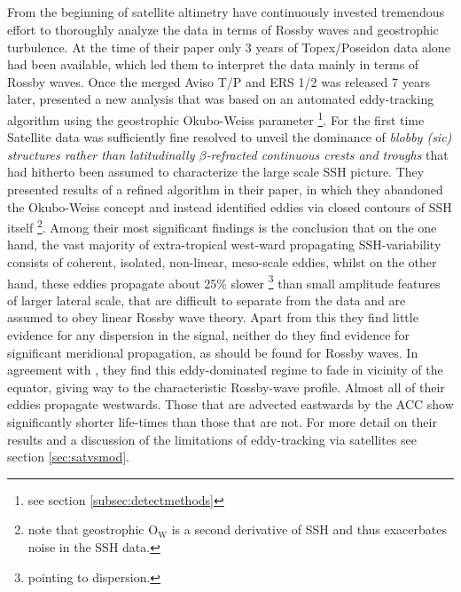 \subsection{\cite{Killworth1997a,Chelton2007,Chelton2011}}\label{sec:hist_chelton}
From the beginning of satellite altimetry \citeauthor{Chelton2011} have continuously invested tremendous effort to thoroughly analyze the data in terms of
Rossby waves and geostrophic turbulence. At the time of their \citeyear{Killworth1997a} paper only 3 years of Topex/Poseidon data alone had been available,
which led them to interpret the data mainly in terms of Rossby waves. Once the merged Aviso T/P and ERS 1/2  was released 7 years later,
\citeauthor{Chelton2007} presented a new analysis that was based on an automated eddy-tracking algorithm using the geostrophic Okubo-Weiss parameter
\footnote{see section \ref{subsec:detectmethods}}. For the first time Satellite data was sufficiently fine resolved to unveil the dominance of \textit{blobby
(sic) structures rather than latitudinally $\beta$-refracted continuous crests and troughs} that had hitherto been assumed to characterize the large scale SSH
picture. They presented results of a refined algorithm in their \citeyear{Chelton2011} paper, in
which they abandoned the Okubo-Weiss concept and instead identified eddies via closed contours of SSH itself \footnote{note that geostrophic $\mathrm{O_W}$ is a
second derivative of SSH and thus exacerbates noise in the SSH data.}. Among their most significant findings is the conclusion that on the one hand, the vast
majority of extra-tropical west-ward propagating SSH-variability consists of coherent, isolated, non-linear, meso-scale eddies, whilst on the other hand, these
eddies propagate about 25\% slower \footnote{pointing to dispersion.} than small amplitude features of larger lateral scale, that are difficult to separate from
the data and are assumed to obey linear Rossby wave theory.  Apart from this they find little evidence for any dispersion in the signal,
neither do they find evidence for significant meridional propagation, as should be found for Rossby waves. In agreement with \cite{rhines1979theoretical}, they
find this eddy-dominated regime to fade in vicinity of the equator,
giving way to the characteristic Rossby-wave profile. Almost all of their eddies propagate westwards. Those that are advected eastwards by \eg the ACC show significantly shorter life-times than those that are not. For more detail on their results and a discussion of the limitations of eddy-tracking via satellites see section \ref{sec:satvsmod}.
